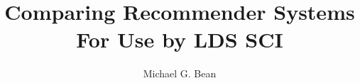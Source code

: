 \documentclass[12pt]{report}
\begin{document}
\title{Comparing Recommender Systems For Use by LDS SCI}
\author{Michael G. Bean}

\showBYUHeader


%
%
%

%
%












\end{document}
